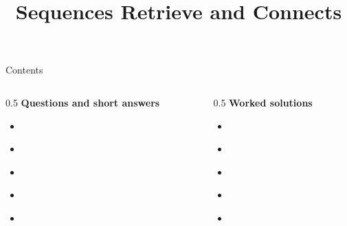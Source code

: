 \documentclass{beamer}
\title{Sequences Retrieve and Connects}
\author{}
\date{}
\begin{document}
\frame{\titlepage}

\begin{frame}{Contents}
\small
\begin{columns}[T]
  \begin{column}{0.5\textwidth}
    \textbf{Questions and short answers}
    \begin{itemize}
      \item \hyperlink{q-st1}{}
      \item \hyperlink{q-st2}{}
      \item \hyperlink{q-st3}{}
      \item \hyperlink{q-st4}{}
      \item \hyperlink{q-st5}{}
    \end{itemize}
  \end{column}
  \begin{column}{0.5\textwidth}
    \textbf{Worked solutions}
    \begin{itemize}
      \item \hyperlink{work-st1}{}
      \item \hyperlink{work-st2}{}
      \item \hyperlink{work-st3}{}
      \item \hyperlink{work-st4}{}
      \item \hyperlink{work-st5}{}
    \end{itemize}
  \end{column}
\end{columns}
\end{frame}
\end{document}
